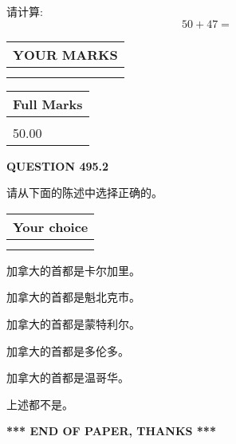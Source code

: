 \documentclass{ctexart}
\begin{document}
  
 
请计算:
\begin{equation}
50 +  %
47 = \nonumber
\end{equation}
 

 

 
  
\vspace{0.2in}
  
\noindent\begin{tabular}{|l|}
\hline
 YOUR MARKS  \\
\hline
 \\ 
 \\ 
\hline
\end{tabular}
\hspace{0.05in} \begin{tabular}{|l|}
\hline
 Full Marks  \\
\hline
 \\ 
50.00 \\
\hline
\end{tabular}
{\textbf{\Large{QUESTION
495.2 
}}}
  
  
请从下面的陈述中选择正确的。
  
  
\noindent\hspace{3.0in} \begin{tabular}{|l|}
\hline
Your choice \\
\hline
 \\ 
 \\ 
\hline
\end{tabular}
  
  
 
 
加拿大的首都是卡尔加里。
 
 
加拿大的首都是魁北克市。
 
 
加拿大的首都是蒙特利尔。
 
 
加拿大的首都是多伦多。
 
 
加拿大的首都是温哥华。
 
 
 上述都不是。
 
 
   
   
 \vspace{0.2in}
 
   
   
   
   
\vspace{1.0in} 
{\textbf{\large{ *** END OF PAPER, THANKS *** }}} 
   
\end{document}
